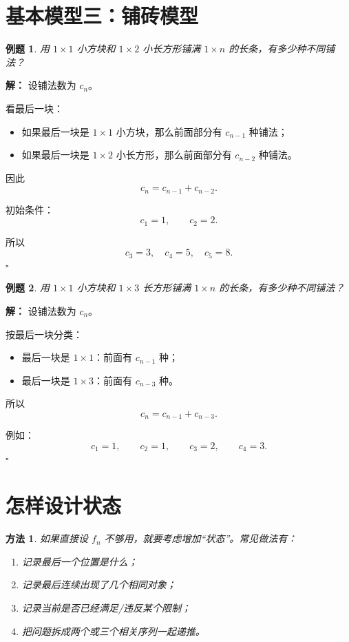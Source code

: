 \documentclass[11pt,a4paper,fontset=fandol]{ctexart}
\theoremstyle{formaltheorem}
\newtheorem{method}{方法}[section]
\theoremstyle{formalexample}
\newtheorem{example}{例题}[section]
\newenvironment{solution}{\par\noindent\textbf{解：}}{\hfill$\square$\par}
\begin{document}
\section{基本模型三：铺砖模型}

\begin{example}
用 $1\times 1$ 小方块和 $1\times 2$ 小长方形铺满 $1\times n$ 的长条，有多少种不同铺法？
\end{example}

\begin{solution}
设铺法数为 $c_n$。

看最后一块：
\begin{itemize}
  \item 如果最后一块是 $1\times 1$ 小方块，那么前面部分有 $c_{n-1}$ 种铺法；
  \item 如果最后一块是 $1\times 2$ 小长方形，那么前面部分有 $c_{n-2}$ 种铺法。
\end{itemize}

因此
\[
  c_n=c_{n-1}+c_{n-2}.
\]

初始条件：
\[
  c_1=1,
  \qquad
  c_2=2.
\]

所以
\[
  c_3=3,
  \quad
  c_4=5,
  \quad
  c_5=8.
\]
\end{solution}

\begin{example}
用 $1\times 1$ 小方块和 $1\times 3$ 长方形铺满 $1\times n$ 的长条，有多少种不同铺法？
\end{example}

\begin{solution}
设铺法数为 $c_n$。

按最后一块分类：
\begin{itemize}
  \item 最后一块是 $1\times 1$：前面有 $c_{n-1}$ 种；
  \item 最后一块是 $1\times 3$：前面有 $c_{n-3}$ 种。
\end{itemize}

所以
\[
  c_n=c_{n-1}+c_{n-3}.
\]

例如：
\[
  c_1=1,
  \qquad
  c_2=1,
  \qquad
  c_3=2,
  \qquad
  c_4=3.
\]
\end{solution}

\section{怎样设计状态}

\begin{method}
如果直接设 $f_n$ 不够用，就要考虑增加“状态”。常见做法有：
\begin{enumerate}
  \item 记录最后一个位置是什么；
  \item 记录最后连续出现了几个相同对象；
  \item 记录当前是否已经满足/违反某个限制；
  \item 把问题拆成两个或三个相关序列一起递推。
\end{enumerate}
\end{method}
\end{document}
